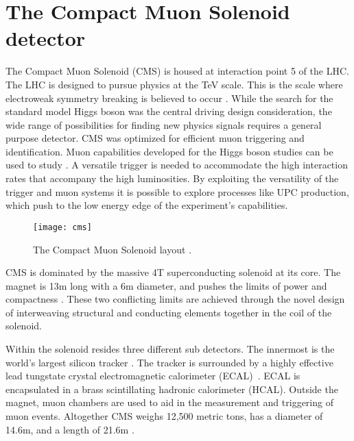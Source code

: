 \chapter{\label{ch:detector} The Compact Muon Solenoid detector}	
  The Compact Muon Solenoid (CMS) is housed at interaction point 5 of the 
    LHC. 
  The LHC is designed to pursue physics at the TeV scale. 
  This is the scale where electroweak symmetry breaking is believed to occur
  	\cite{CmsPTdrv2}.
  While the search for the standard model Higgs boson was the 
    central driving design consideration, the wide range of possibilities for
  	finding new physics signals requires a general purpose detector.
  CMS was optimized for efficient muon triggering and identification. 
  Muon capabilities developed for the Higgs boson studies can be used to study 
    \JPsi{}. 
  A versatile trigger is needed to accommodate the high interaction rates that 
    accompany the high luminosities. 
  By exploiting the versatility of the trigger and muon systems it
    is possible to explore processes like UPC \JPsi{} production, 
    which push to the low energy edge of the experiment's capabilities. 
  \begin{figure}[h]
    \centering
      \texttt{[image: cms]}
    \caption{The Compact Muon Solenoid layout \cite{tCmsE}.}
    \label{cms}
  \end{figure}
  
  CMS is dominated by the massive 4T 
  	superconducting solenoid at its core.
  The magnet is 13m long with a 6m diameter, and pushes the limits of power
  	and compactness \cite{tCmsE}. 
  These two conflicting limits are achieved through the novel design of 
  	interweaving structural and conducting elements together in the coil of
  	the solenoid.

  Within the solenoid resides three different sub detectors.
  The innermost is the world's largest silicon tracker \cite{tCmsE}.
  The tracker is surrounded by a highly effective lead tungstate crystal 
    electromagnetic calorimeter (ECAL)~\cite{CMS:2002xia}.
  ECAL is encapsulated in a brass scintillating hadronic calorimeter (HCAL).
  Outside the magnet, muon chambers are used to aid in the measurement and 
    triggering of muon events. 
  Altogether CMS weighs 12,500 metric tons, has a diameter of 14.6m,
    and a length of 21.6m \cite{tCmsE}.

